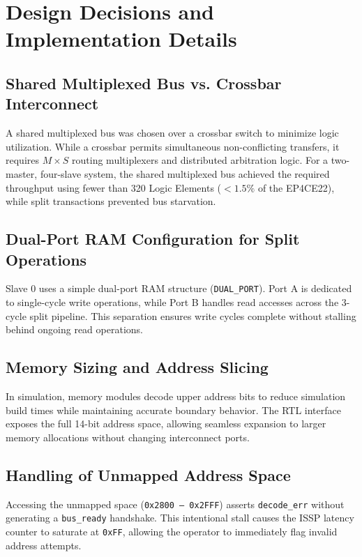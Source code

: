 \documentclass[11pt,a4paper]{article}
\begin{document}
\section{Design Decisions and Implementation Details}

\subsection{Shared Multiplexed Bus vs. Crossbar Interconnect}
A shared multiplexed bus was chosen over a crossbar switch to minimize logic utilization. While a crossbar permits simultaneous non-conflicting transfers, it requires $M \times S$ routing multiplexers and distributed arbitration logic. For a two-master, four-slave system, the shared multiplexed bus achieved the required throughput using fewer than 320 Logic Elements ($<1.5\%$ of the EP4CE22), while split transactions prevented bus starvation.

\subsection{Dual-Port RAM Configuration for Split Operations}
Slave 0 uses a simple dual-port RAM structure (\texttt{DUAL\_PORT}). Port A is dedicated to single-cycle write operations, while Port B handles read accesses across the 3-cycle split pipeline. This separation ensures write cycles complete without stalling behind ongoing read operations.

\subsection{Memory Sizing and Address Slicing}
In simulation, memory modules decode upper address bits to reduce simulation build times while maintaining accurate boundary behavior. The RTL interface exposes the full 14-bit address space, allowing seamless expansion to larger memory allocations without changing interconnect ports.

\subsection{Handling of Unmapped Address Space}
Accessing the unmapped space (\texttt{0x2800 -- 0x2FFF}) asserts \texttt{decode\_err} without generating a \texttt{bus\_ready} handshake. This intentional stall causes the ISSP latency counter to saturate at \texttt{0xFF}, allowing the operator to immediately flag invalid address attempts.
\end{document}
